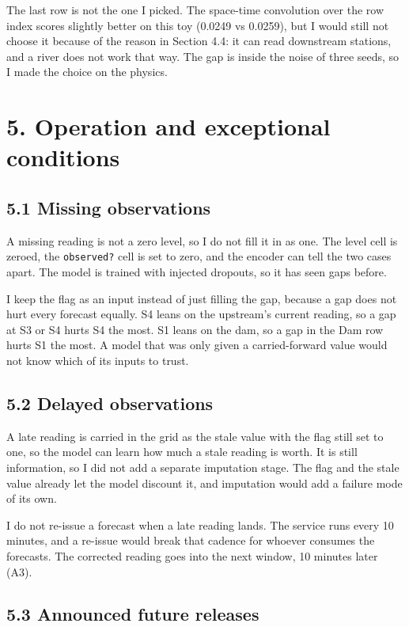 \documentclass[11pt,letterpaper]{article}
\begin{document}
The last row is not the one I picked. The space-time convolution over the row index
scores slightly better on this toy (0.0249 vs 0.0259), but I would still not choose
it because of the reason in Section 4.4: it can read downstream stations, and a
river does not work that way. The gap is inside the noise of three seeds, so I made
the choice on the physics.


\section*{5. Operation and exceptional conditions}

\subsection*{5.1 Missing observations}

A missing reading is not a zero level, so I do not fill it in as one. The level
cell is zeroed, the \texttt{observed?} cell is set to zero, and the encoder can tell
the two cases apart. The model is trained with injected dropouts, so it has seen
gaps before.

I keep the flag as an input instead of just filling the gap, because a gap does not
hurt every forecast equally. S4 leans on the upstream's current reading, so a gap at
S3 or S4 hurts S4 the most. S1 leans on the dam, so a gap in the Dam row hurts S1
the most. A model that was only given a carried-forward value would not know which
of its inputs to trust.

\subsection*{5.2 Delayed observations}

A late reading is carried in the grid as the stale value with the flag still set to
one, so the model can learn how much a stale reading is worth. It is still
information, so I did not add a separate imputation stage. The flag and the stale
value already let the model discount it, and imputation would add a failure mode of
its own.

I do not re-issue a forecast when a late reading lands. The service runs every 10
minutes, and a re-issue would break that cadence for whoever consumes the forecasts.
The corrected reading goes into the next window, 10 minutes later (A3).

\subsection*{5.3 Announced future releases}
\end{document}

